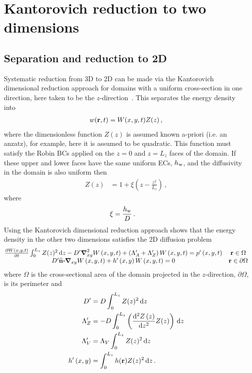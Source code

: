 \documentclass[a4paper]{article}
\numberwithin{equation}{section}
\begin{document}
\section[Kantorovich reduction to two dimensions]{Kantorovich reduction to two dimensions}
\label{sc:Kant}

\subsection[Separation and reduction to 2D]{Separation and reduction to 2D}
\label{sc:Kant:red}

Systematic reduction from 3D to 2D can be made via the Kantorovich dimensional
reduction approach for domains with a uniform cross-section in one direction,
here taken to be the $z$-direction~\citep{Sequeira2012}. This separates the energy density into
\begin{align}
w(\boldsymbol{\mathrm{r}},t) = W(x,y,t)Z(z)\,,
\end{align}
where the dimensionless function $Z(z)$ is assumed known a-priori
(i.e. an anzatz), for example, here it is assumed to be quadratic. This function must
satisfy the Robin BCs applied on the  $z=0$ and  $z=L_z$ faces of the domain.
If these upper and lower faces have the same uniform ECs, $h_{\mathrm{w}}$, and the
diffusivity in the domain is also uniform then
\begin{align}
Z(z) &= 1 + \xi\left( z-\frac{z^2}{L_z} \right)\,,
\end{align}
where
\begin{align}
\xi &= \frac{h_{\mathrm{w}}} D\,.
\end{align}
Using the Kantorovich dimensional reduction approach shows that the energy
density in the other two dimensions satisfies the 2D diffusion problem~\citep{Kantorovich1964}
\begin{align}
\begin{matrix}
\frac{{\partial}W\left(x,y,t\right)}{{\partial}t}
\int_0^{L_z}Z(z)^2\,\mathrm{d}{z}
- D^\prime{\boldsymbol{\mathrm{\nabla}}}_{xy}^2W\left(x,y,t\right)
+ \left(\Lambda_A^\prime+\Lambda_Z^\prime\right)W\left(x,y,t\right)
= p^\prime\left(x,y,t\right)
& \boldsymbol{\mathrm{r}}\in\Omega\\
D^\prime\widehat{\boldsymbol{\mathrm{n}}}{\boldsymbol{\mathrm{\cdot}}}{\boldsymbol{\mathrm{\nabla}}}_{xy}W\left(x,y,t\right)+h^\prime\left(x,y\right)W\left(x,y,t\right)=0
&\boldsymbol{\mathrm{r}}\in\partial\Omega
\end{matrix}
\end{align}
where $\Omega$ is the cross-sectional area of the domain projected in the
$z$-direction, $\partial\Omega$, is its perimeter and
\begin{align}
D^\prime &= D \int_0^{L_z} Z(z)^2\,\mathrm{d}{z} \\
\Lambda_Z^\prime &= -D \int_0^{L_z} \left(\frac{\mathrm{d}^2Z\left(z\right)}{\mathrm{d} z^2}Z(z)\right)\,\mathrm{d}{z} \\
\Lambda_V^\prime &= \Lambda_V \int_0^{L_z} Z(z)^2\,\mathrm{d}{z} \\
h^\prime\left(x,y\right) &= \int_0^{L_z} h(\boldsymbol{\mathrm{r}}) Z(z)^2\,\mathrm{d}{z}\,.
\end{align}
\end{document}
